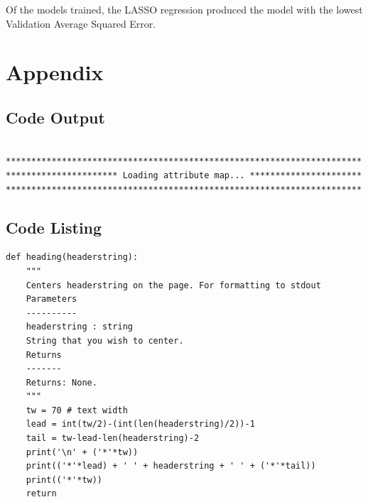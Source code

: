 \documentclass[12pt]{article}
\begin{document}
Of the models trained, the LASSO regression produced the model with
the lowest Validation Average Squared Error. 

\section{Appendix}

\subsection{Code Output}

\begin{verbatim}

**********************************************************************
********************** Loading attribute map... **********************
**********************************************************************

\end{verbatim}

\subsection{Code Listing}

{\tiny{}}
\begin{lstlisting}
def heading(headerstring):
    """
    Centers headerstring on the page. For formatting to stdout
    Parameters
    ----------
    headerstring : string
    String that you wish to center.
    Returns
    -------
    Returns: None.
    """
    tw = 70 # text width
    lead = int(tw/2)-(int(len(headerstring)/2))-1
    tail = tw-lead-len(headerstring)-2
    print('\n' + ('*'*tw))
    print(('*'*lead) + ' ' + headerstring + ' ' + ('*'*tail))
    print(('*'*tw))
    return
\end{lstlisting}
%
%
\end{document}
